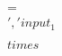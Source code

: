 \documentclass[preview]{standalone}
\begin{document}
\begin{align*}
\quad\\ =\quad\\ ', 'input_1\quad\\ \quad\\times\quad\\
\end{align*}
\end{document}
